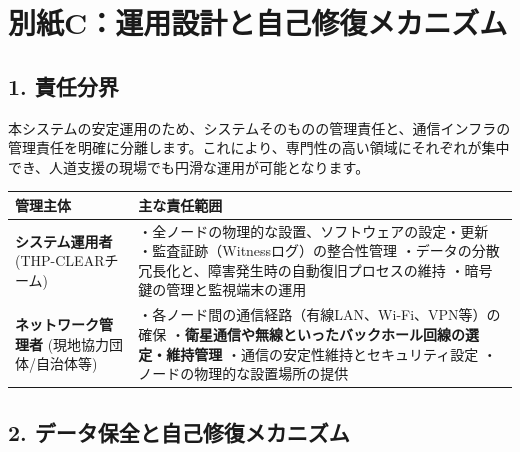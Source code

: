 \documentclass[
  a4paper,
  ja=standard,
  xelatex]{bxjsarticle}
\begin{document}
\section{\texorpdfstring{\textbf{別紙C：運用設計と自己修復メカニズム}}{別紙C：運用設計と自己修復メカニズム}}\label{ux5225ux7d19cux904bux7528ux8a2dux8a08ux3068ux81eaux5df1ux4feeux5fa9ux30e1ux30abux30cbux30baux30e0}

\subsection{\texorpdfstring{\textbf{1.
責任分界}}{1. 責任分界}}\label{ux8cacux4efbux5206ux754c}

本システムの安定運用のため、システムそのものの管理責任と、通信インフラの管理責任を明確に分離します。これにより、専門性の高い領域にそれぞれが集中でき、人道支援の現場でも円滑な運用が可能となります。

\begin{longtable}[]{@{}
  >{\raggedright\arraybackslash}p{}
  >{\raggedright\arraybackslash}p{}@{}}
\toprule\noalign{}
\begin{minipage}[b]{\linewidth}\raggedright
管理主体
\end{minipage} & \begin{minipage}[b]{\linewidth}\raggedright
主な責任範囲
\end{minipage} \\
\midrule\noalign{}
\endhead
\bottomrule\noalign{}
\endlastfoot
\textbf{システム運用者} (THP-CLEARチーム) &
・全ノードの物理的な設置、ソフトウェアの設定・更新
・監査証跡（Witnessログ）の整合性管理
・データの分散冗長化と、障害発生時の自動復旧プロセスの維持
・暗号鍵の管理と監視端末の運用 \\
\textbf{ネットワーク管理者} (現地協力団体/自治体等) &
・各ノード間の通信経路（有線LAN、Wi-Fi、VPN等）の確保
・\textbf{衛星通信や無線といったバックホール回線の選定・維持管理}
・通信の安定性維持とセキュリティ設定 ・ノードの物理的な設置場所の提供 \\
\end{longtable}

\subsection{\texorpdfstring{\textbf{2.
データ保全と自己修復メカニズム}}{2. データ保全と自己修復メカニズム}}\label{ux30c7ux30fcux30bfux4fddux5168ux3068ux81eaux5df1ux4feeux5fa9ux30e1ux30abux30cbux30baux30e0}
\end{document}
